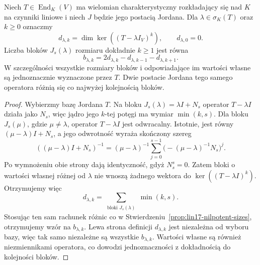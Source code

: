 \begin{twierdzenie}
\label{thm:lin17-jordan-uniqueness}
Niech \(T\in\operatorname{End}_K(V)\)
ma wielomian charakterystyczny rozkładający się
nad \(K\) na czynniki liniowe
i niech \(J\) będzie jego postacią Jordana.
Dla \(\lambda\in\sigma_K(T)\) oraz
\(k\ge0\) oznaczmy
\[
 d_{\lambda,k}
 =\dim\ker((T-\lambda I_V)^k),
 \qquad d_{\lambda,0}=0.
\]
Liczba bloków \(J_s(\lambda)\) rozmiaru
dokładnie \(k\ge1\) jest równa
\[
 b_{\lambda,k}
 =2d_{\lambda,k}
  -d_{\lambda,k-1}
  -d_{\lambda,k+1}.
\]
W szczególności wszystkie rozmiary bloków
i odpowiadające im wartości własne są
jednoznacznie wyznaczone przez \(T\).
Dwie postacie Jordana tego samego operatora
różnią się co najwyżej kolejnością bloków.
\end{twierdzenie}
\begin{proof}
Wybierzmy bazę Jordana \(T\).
Na bloku \(J_s(\lambda)=\lambda I+N_s\)
operator \(T-\lambda I\) działa
jako \(N_s\), więc jądro jego \(k\)-tej potęgi
ma wymiar \(\min(k,s)\).
Dla bloku \(J_s(\mu)\), gdzie \(\mu\ne\lambda\),
operator \(T-\lambda I\) jest odwracalny.
Istotnie, jest równy
\((\mu-\lambda)I+N_s\),
a jego odwrotność wyraża skończony szereg
\[
 ((\mu-\lambda)I+N_s)^{-1}
 =(\mu-\lambda)^{-1}
 \sum_{j=0}^{s-1}
 \bigl(-(\mu-\lambda)^{-1}N_s\bigr)^j.
\]
Po wymnożeniu obie strony
dają identyczność, gdyż \(N_s^s=0\).
Zatem bloki o wartości własnej
różnej od \(\lambda\)
nie wnoszą żadnego wektora
do \(\ker((T-\lambda I)^k)\).
Otrzymujemy więc
\[
 d_{\lambda,k}
 =\sum_{\substack{\text{bloki }J_s(\lambda)}}
          \min(k,s).
\]
Stosując ten sam rachunek różnic
co w Stwierdzeniu~\ref{prop:lin17-nilpotent-sizes},
otrzymujemy wzór na \(b_{\lambda,k}\).
Lewa strona definicji \(d_{\lambda,k}\)
jest niezależna od wyboru bazy,
więc tak samo niezależne są wszystkie
\(b_{\lambda,k}\).
Wartości własne są również niezmiennikami
operatora, co dowodzi jednoznaczności
z dokładnością do kolejności bloków.
\end{proof}

